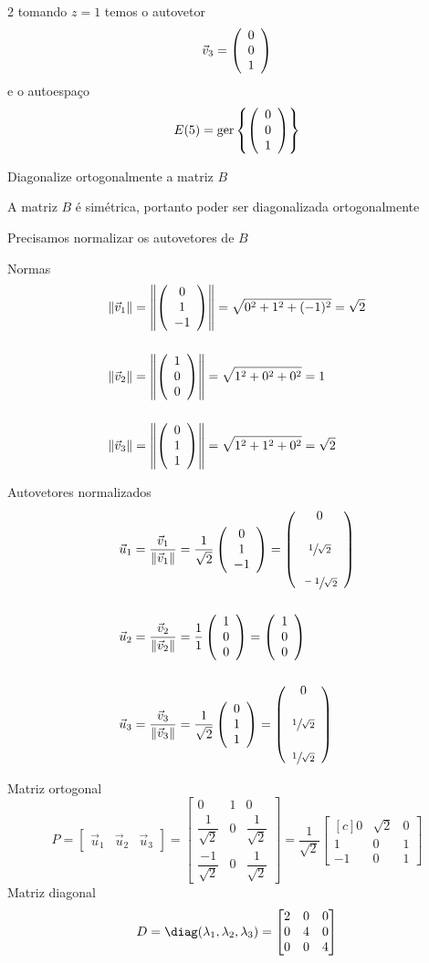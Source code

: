\documentclass[a4paper,12pt,fleqn]{article}
\begin{document}
\begin{answer}
\begin{multicols}{2}
  tomando $z=1$ temos o autovetor
  \[
    \vec{v}_3 = \left(\begin{array}{c} 0 \\ 0 \\ 1 \end{array}\right)
  \]
  e o autoespaço
  \[
    E(5) = \operatorname{ger} \left\{ \left(\begin{array}{c} 0 \\ 0 \\ 1 \end{array}\right) \right\}
  \]
\end{multicols}
\end{answer}

Diagonalize ortogonalmente a matriz $B$

\begin{answer}
  A matriz $B$ é simétrica, portanto poder ser diagonalizada ortogonalmente

  Precisamos normalizar os autovetores de $B$

  Normas
  \begin{align*}
    \norm{\vec{v}_1}
    & = \norm{\vetortri{0}{1}{-1}}
    = \sqrt{0^2 + 1^2 + (-1)^2}
    = \sqrt{2}
    \\[5mm]
    \norm{\vec{v}_2}
    & = \norm{\vetortri{1}{0}{0}}
    = \sqrt{1^2 + 0^2 + 0^2}
    = 1
    \\[5mm]
    \norm{\vec{v}_3}
    & = \norm{\vetortri{0}{1}{1}}
    = \sqrt{1^2 + 1^2 + 0^2}
    = \sqrt{2}
  \end{align*}

  Autovetores normalizados
  \begin{align*}
    \vec{u}_1
    & = \frac{\vec{v}_1}{\norm{\vec{v}_1}}
    = \frac{1}{\sqrt{2}} \vetortri{0}{1}{-1}
    = \Vetortri{0}{\sfrac{1}{\sqrt{2}}}{\sfrac{-1}{\sqrt{2}}}
    \\[5mm]
    \vec{u}_2
    & = \frac{\vec{v}_2}{\norm{\vec{v}_2}}
    = \frac{1}{1} \vetortri{1}{0}{0}
    = \vetortri{1}{0}{0}
    \\[5mm]
    \vec{u}_3
    & = \frac{\vec{v}_3}{\norm{\vec{v}_3}}
    = \frac{1}{\sqrt{2}} \vetortri{0}{1}{1}
    = \Vetortri{0}{\sfrac{1}{\sqrt{2}}}{\sfrac{1}{\sqrt{2}}}
  \end{align*}

  Matriz ortogonal
  \[
    P
    = \begin{bmatrix}
      \vec{u}_1 & \vec{u}_2 & \vec{u}_3
    \end{bmatrix}
    = \begin{bmatrix}
      0                    & 1 & 0                   \\[3mm]
      \dfrac{1}{\sqrt{2}}  & 0 & \dfrac{1}{\sqrt{2}} \\[3mm]
      \dfrac{-1}{\sqrt{2}} & 0 & \dfrac{1}{\sqrt{2}}
    \end{bmatrix}
    = \frac{1}{\sqrt{2}} \begin{bmatrix}[c]
      0  & \sqrt{2} & 0 \\
      1  & 0        & 1 \\
      -1 & 0        & 1
    \end{bmatrix}
  \]
  Matriz diagonal
  \[
    D
    = \diag( \lambda_1, \lambda_2, \lambda_3 )
    = \begin{bmatrix}
      2 & 0 & 0 \\
      0 & 4 & 0 \\
      0 & 0 & 4
    \end{bmatrix}
  \]
\end{answer}
\end{document}
